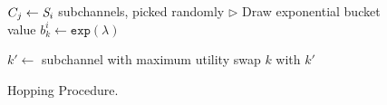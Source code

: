 


\begin{figure}[tbp]
\begin{minipage}{.45\textwidth}
\begin{algorithmic}[1]
 {\small
	

		
		\State $C_j \gets \id{S}_i$ subchannels, picked randomly
				\State $\triangleright$ Draw exponential bucket value 
				\State $b_k^i \gets \texttt{exp}(\lambda)$ 
		\EndFor
	
				\State $k' \gets$ subchannel with maximum utility
				\State swap $k$ with $k'$ 
			\EndIf
		\EndFor
	\EndFor
\EndFunction
}
\end{algorithmic}
\vspace{-6pt}
\caption{{Hopping Procedure.}} 
\vspace{-12pt}
\label{fig:hopping}
\end{minipage}
\end{figure}


